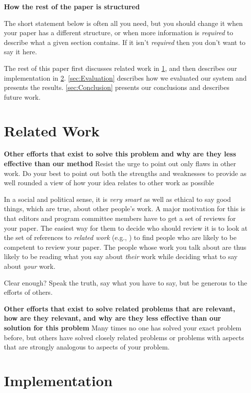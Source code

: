 \documentclass[pdf,bookmarks,colorlinks=true]{IEEEtran}
\begin{document}
\textbf{How the rest of the paper is structured}

The short statement below is often all you need, but you should change it when your paper has a different structure, or when more information is {\em required} to describe what a given section contains. If it isn't {\em required} then you don't want to say it here.

The rest of this paper first discusses related work in \ref{sec:RelatedWork}, and then describes our implementation in \ref{sec:Implementation}. \ref{sec:Evaluation} describes how we evaluated our system and presents the results. \ref{sec:Conclusion} presents our conclusions and describes future work.

\section{Related Work}\label{sec:RelatedWork}

\textbf{Other efforts that exist to solve this problem and why are they less effective than our method} Resist the urge to point out only flaws in other work. Do your best to point out both the strengths and weaknesses to provide as well rounded a view of how your idea relates to other work as possible 

In a social and political sense, it is {\em very smart} as well as ethical to say good things, which are true, about other people's work. A major motivation for this is that editors and program committee members have to get a set of reviews for your paper. The easiest way for them to decide who should review it is to look at the set of references to {\em related work} (e.g., \cite{Anderson2007,Anderson2009}) to find people who are likely to be competent to review your paper.  The people whose work you talk about are thus likely to be reading what you say about {\em their} work while deciding what to say about {\em your} work.

Clear enough? Speak the truth, say what you have to say, but be generous to the efforts of others.

\textbf{Other efforts that exist to solve related problems that are relevant, how are they relevant, and why are they less effective than our solution for this problem}
Many times no one has solved your exact problem before, but others have solved closely related problems or problems with aspects that are strongly analogous to aspects of your problem.

\section{Implementation}\label{sec:Implementation}
\end{document}
